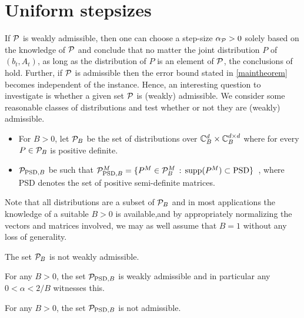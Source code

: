 \section{Uniform stepsizes}\label{sec:uniform}
If $\P$ is weakly admissible, then one can choose a step-size $\alpha_{\P}>0$ solely based on the knowledge of $\P$ and
conclude that no matter the joint distribution $P$ of $(b_t,A_t)$, as long as the distribution of $P$ is an element of $\P$, the conclusions of  hold. Further, if $\P$ is admissible then the error bound stated in  \cref{maintheorem} becomes independent of the instance. Hence, an interesting question to investigate is whether a given set $\P$ is (weakly) admissible. We consider some reasonable classes of distributions and test whether or not they are (weakly) admissible.
\begin{definition}\label{def:pclass}
\begin{itemize}[leftmargin=*, before = \leavevmode\vspace{-\baselineskip}]
\item For $B>0$, let $\P_B$ be the set of distributions over $\C_B^{d}\times \C_B^{\dcd}$ where for every $P\in \P_B$ is positive definite.
\item  $\P_{\text{PSD},B}$ be such that  $\P^M_{\text{PSD},B}=\{ P^M \in \P^M_B \,:\,  \supp(P^M)\subset \text{PSD} \}\,$ , where PSD denotes the set of positive semi-definite matrices.
\end{itemize}
\end{definition}
Note that all distributions are a subset of $\P_B$ and in most applications the knowledge of a suitable $B>0$ is available,and by appropriately normalizing the vectors and matrices involved, we may as well assume that $B=1$ without any loss of generality.
\begin{proposition}\label{notwad}
The set $\P_B$ is not weakly admissible.
\end{proposition}
\begin{proposition}\label{lm:ppsdbwd}
For any $B>0$, the set $\P_{\text{PSD},B}$ is weakly admissible
and in particular any $0<\alpha < 2/B$ witnesses this.
\end{proposition}
\begin{proposition}\label{lm:ppsdbna}
For any $B>0$, the set $\P_{\text{PSD},B}$ is not admissible.
\end{proposition}

